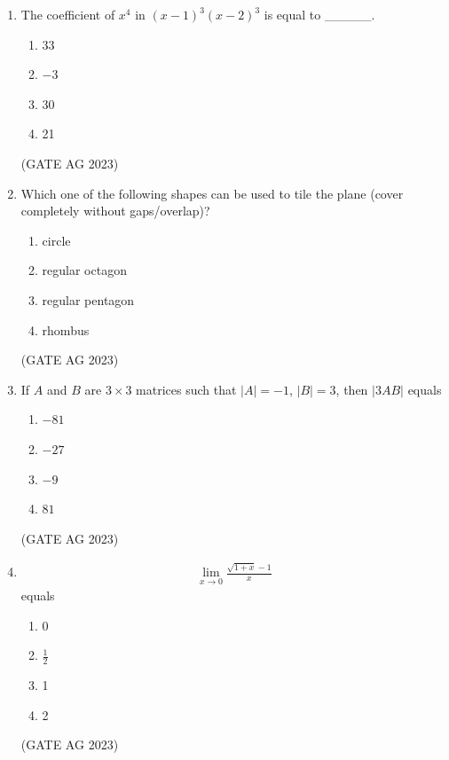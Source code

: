 \documentclass[journal,12pt,onecolumn]{IEEEtran}
\theoremstyle{remark}
\begin{document}
\begin{enumerate}
\item The coefficient of $x^4$ in $(x-1)^3(x-2)^3$ is equal to \_\_\_\_\_.
\begin{multicols}{4}
\begin{enumerate}
    \item 33
    \item $-3$
    \item 30
    \item 21
\end{enumerate}
\end{multicols}
\hfill{(GATE AG 2023)}

\item Which one of the following shapes can be used to tile the plane (cover completely without gaps/overlap)?
\begin{multicols}{4}
\begin{enumerate}
    \item circle
    \item regular octagon
    \item regular pentagon
    \item rhombus
\end{enumerate}
\end{multicols}
\hfill{(GATE AG 2023)}

\item If $A$ and $B$ are $3\times 3$ matrices such that $|A|=-1$, $|B|=3$, then $|3AB|$ equals
\begin{multicols}{4}
\begin{enumerate}
    \item $-81$
    \item $-27$
    \item $-9$
    \item $81$
\end{enumerate}
\end{multicols}
\hfill{(GATE AG 2023)}

\item 
\begin{align*}
\lim\limits_{x \to 0} \frac{\sqrt{1+x}-1}{x}
\end{align*}
equals
\begin{multicols}{4}
\begin{enumerate}
    \item 0
    \item $\tfrac{1}{2}$
    \item 1
    \item 2
\end{enumerate}
\end{multicols}
\hfill{(GATE AG 2023)}


\end{enumerate}
\end{document}
